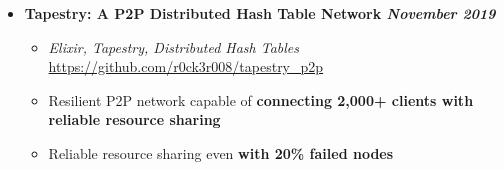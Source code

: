\documentclass[9]{Resume}
\begin{document}
\begin{itemize}[noitemsep,nolistsep]
	\item[]\textbf{Tapestry: A P2P Distributed Hash Table Network \hfill \textit{November 2019}}
		\begin{itemize}[leftmargin=*]
			\setlength\itemsep{-0.25em}
			\item[\textbullet]\textit{Elixir, Tapestry, Distributed Hash Tables} \hfill \href{https://github.com/r0ck3r008/tapestry\_p2p}{{\scriptsize https://github.com/r0ck3r008/tapestry\_p2p}}
			\item[\textbullet]Resilient P2P network capable of \textbf{connecting 2,000+ clients with reliable resource sharing}
			\item[\textbullet]Reliable resource sharing even \textbf{with 20\% failed nodes}
		\end{itemize}

\end{itemize}
\end{document}
